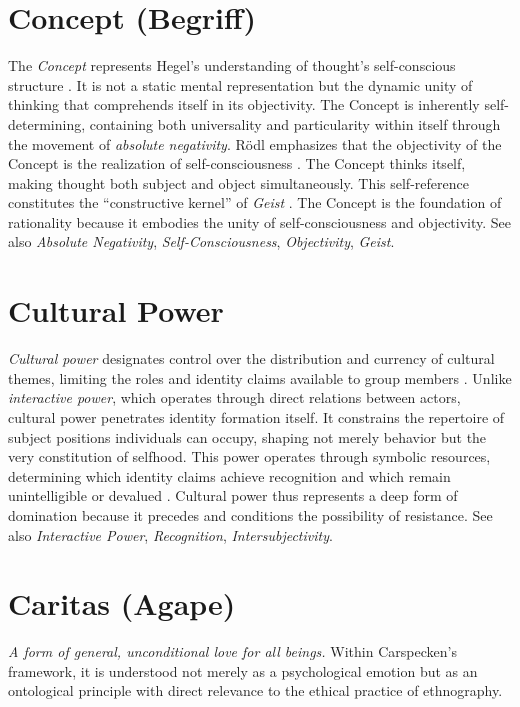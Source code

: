 \documentclass{book}
\begin{document}
\section{Concept (Begriff)}

The \textit{Concept} represents Hegel's understanding of thought's self-conscious structure \parencite{Rodl:2019aa}. It is not a static mental representation but the dynamic unity of thinking that comprehends itself in its objectivity. The Concept is inherently self-determining, containing both universality and particularity within itself through the movement of \textit{absolute negativity}. R\"odl emphasizes that the objectivity of the Concept is the realization of self-consciousness \parencite{Rodl:2018aa}. The Concept thinks itself, making thought both subject and object simultaneously. This self-reference constitutes the ``constructive kernel'' of \textit{Geist} \parencite{Negarestani2018}. The Concept is the foundation of rationality because it embodies the unity of self-consciousness and objectivity. See also \textit{Absolute Negativity}, \textit{Self-Consciousness}, \textit{Objectivity}, \textit{Geist}.

\section{Cultural Power}

\textit{Cultural power} designates control over the distribution and currency of cultural themes, limiting the roles and identity claims available to group members \parencite[131--132]{Carspecken1995aa}. Unlike \textit{interactive power}, which operates through direct relations between actors, cultural power penetrates identity formation itself. It constrains the repertoire of subject positions individuals can occupy, shaping not merely behavior but the very constitution of selfhood. This power operates through symbolic resources, determining which identity claims achieve recognition and which remain unintelligible or devalued \parencite[65]{Carspecken1999}. Cultural power thus represents a deep form of domination because it precedes and conditions the possibility of resistance. See also \textit{Interactive Power}, \textit{Recognition}, \textit{Intersubjectivity}.


\section{Caritas (Agape)}

\textit{A form of general, unconditional love for all beings.} Within Carspecken's framework, it is understood not merely as a psychological emotion but as an ontological principle with direct relevance to the ethical practice of ethnography.
\end{document}
